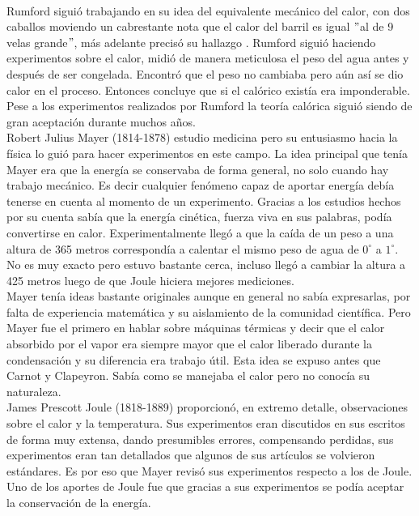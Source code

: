\\
Rumford siguió trabajando en su idea del equivalente mecánico del calor, con dos caballos moviendo un cabrestante nota que el calor del barril es igual $"$al de 9 velas grande$"$, más adelante precisó su hallazgo \cite{MullerHistory}. Rumford siguió haciendo experimentos sobre el calor, midió de manera meticulosa el peso del agua antes y después de ser congelada. Encontró que el peso no cambiaba pero aún así se dio calor en el proceso. Entonces concluye que si el calórico existía era imponderable. Pese a los experimentos realizados por Rumford la teoría calórica siguió siendo de gran aceptación durante muchos años.	
\\
Robert Julius Mayer (1814-1878) estudio medicina pero su entusiasmo hacia la física lo guió para hacer experimentos en este campo. La idea principal que tenía Mayer era que la energía se conservaba de forma general, no solo cuando hay trabajo mecánico. Es decir cualquier fenómeno capaz de aportar energía debía tenerse en cuenta al momento de un experimento. Gracias a los estudios hechos por su cuenta sabía que la energía cinética, fuerza viva en sus  palabras, podía convertirse en calor. Experimentalmente llegó a que la caída de un peso a una altura  de 365 metros correspondía a calentar el mismo peso de agua de $0^{\circ}$ a $1^{\circ}$. No es muy exacto pero estuvo bastante cerca, incluso llegó a cambiar la altura a 425 metros luego de que Joule hiciera mejores mediciones.
\\
Mayer tenía ideas bastante originales aunque en general no sabía expresarlas, por falta de experiencia matemática y su aislamiento de la comunidad científica. Pero Mayer fue el primero en hablar sobre máquinas térmicas y decir que el calor absorbido por el vapor era siempre mayor que el calor liberado durante la condensación y su diferencia era trabajo útil. Esta idea se expuso antes que Carnot y Clapeyron. Sabía como se manejaba el calor pero no conocía su naturaleza.
\\
James Prescott Joule (1818-1889) proporcionó, en extremo detalle, observaciones sobre el calor y la temperatura. Sus experimentos eran discutidos en sus escritos de forma muy extensa, dando presumibles errores, compensando perdidas, sus experimentos eran tan detallados que algunos de sus artículos se volvieron estándares. Es por eso que Mayer revisó sus experimentos respecto a los de Joule. Uno de los aportes de Joule fue que gracias a sus experimentos se podía aceptar la conservación de la energía. 
\\
